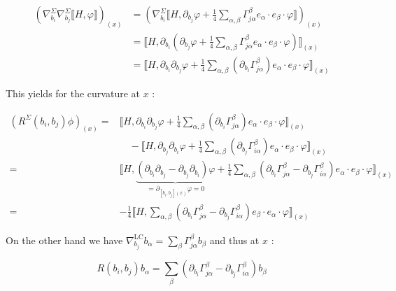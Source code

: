 \documentclass[10pt, letterpaper]{article}
\begin{document}
$$
\begin{aligned}
\left(\nabla_{b_{i}}^{\Sigma} \nabla_{b_{j}}^{\Sigma} \llbracket H, \varphi \rrbracket\right)_{(x)} & =\left(\nabla_{b_{i}}^{\Sigma} \llbracket H, \partial_{b_{j}} \varphi+\frac{1}{4} \sum_{\alpha, \beta} \Gamma_{j \alpha}^{\beta} e_{\alpha} \cdot e_{\beta} \cdot \varphi \rrbracket\right)_{(x)} \\
& =\llbracket H, \partial_{b_{i}}\left(\partial_{b_{j}} \varphi+\frac{1}{4} \sum_{\alpha, \beta} \Gamma_{j \alpha}^{\beta} e_{\alpha} \cdot e_{\beta} \cdot \varphi\right) \rrbracket_{(x)} \\
& =\llbracket H, \partial_{b_{i}} \partial_{b_{j}} \varphi+\frac{1}{4} \sum_{\alpha, \beta}\left(\partial_{b_{i}} \Gamma_{j \alpha}^{\beta}\right) e_{\alpha} \cdot e_{\beta} \cdot \varphi \rrbracket_{(x)}
\end{aligned}
$$

This yields for the curvature at $x$ :

$$
\begin{aligned}
\left(R^{\Sigma}\left(b_{i}, b_{j}\right) \phi\right)_{(x)}= & \llbracket H, \partial_{b_{i}} \partial_{b_{j}} \varphi+\frac{1}{4} \sum_{\alpha, \beta}\left(\partial_{b_{i}} \Gamma_{j \alpha}^{\beta}\right) e_{\alpha} \cdot e_{\beta} \cdot \varphi \rrbracket_{(x)} \\
& \quad-\llbracket H, \partial_{b_{j}} \partial_{b_{i}} \varphi+\frac{1}{4} \sum_{\alpha, \beta}\left(\partial_{b_{j}} \Gamma_{i \alpha}^{\beta}\right) e_{\alpha} \cdot e_{\beta} \cdot \varphi \rrbracket_{(x)} \\
= & \llbracket H, \underbrace{\left(\partial_{b_{i}} \partial_{b_{j}}-\partial_{b_{j}} \partial_{b_{i}}\right) \varphi}_{=\partial_{\left[b_{i}, b_{j}\right](x)} \varphi=0}+\frac{1}{4} \sum_{\alpha, \beta}\left(\partial_{b_{i}} \Gamma_{j \alpha}^{\beta}-\partial_{b_{j}} \Gamma_{i \alpha}^{\beta}\right) e_{\alpha} \cdot e_{\beta} \cdot \varphi \rrbracket_{(x)} \\
= & -\frac{1}{4} \llbracket H, \sum_{\alpha, \beta}\left(\partial_{b_{i}} \Gamma_{j \alpha}^{\beta}-\partial_{b_{j}} \Gamma_{i \alpha}^{\beta}\right) e_{\beta} \cdot e_{\alpha} \cdot \varphi \rrbracket_{(x)}
\end{aligned}
$$

On the other hand we have $\nabla_{b_{j}}^{\mathrm{LC}} b_{\alpha}=\sum_{\beta} \Gamma_{j \alpha}^{\beta} b_{\beta}$ and thus at $x$ :

$$
R\left(b_{i}, b_{j}\right) b_{\alpha}=\sum_{\beta}\left(\partial_{b_{i}} \Gamma_{j \alpha}^{\beta}-\partial_{b_{j}} \Gamma_{i \alpha}^{\beta}\right) b_{\beta}
$$
\end{document}

